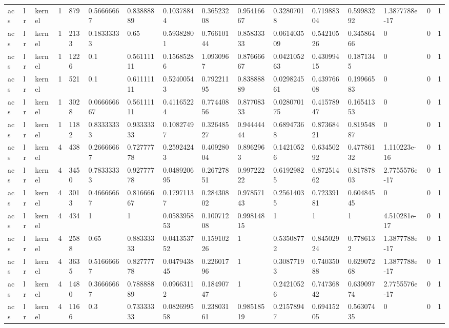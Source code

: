 \begin{tabular}{llllllllllllllll}
acs & lr & kernel & 1 & 879 & 0.56666667 & 0.83888889 & 0.10378844 & 0.36523208 & 0.95416667 & 0.32807018 & 0.71988304 & 0.59983292 & 1.3877788e-17 & 0 & 1 \\
acs & lr & kernel & 1 & 2133 & 0.18333333 & 0.65 & 0.59382801 & 0.76610144 & 0.85833333 & 0.061403509 & 0.54210526 & 0.34586466 & 0 & 0 & 1 \\
acs & lr & kernel & 1 & 1226 & 0.1 & 0.56111111 & 0.15685286 & 1.0930967 & 0.87666667 & 0.042105263 & 0.43099415 & 0.1871345 & 0 & 0 & 1 \\
acs & lr & kernel & 1 & 521 & 0.1 & 0.61111111 & 0.52400543 & 0.79221195 & 0.83888889 & 0.029824561 & 0.43976608 & 0.19966583 & 0 & 0 & 1 \\
acs & lr & kernel & 1 & 3028 & 0.066666667 & 0.56111111 & 0.41165224 & 0.77440856 & 0.87708333 & 0.028070175 & 0.41578947 & 0.16541353 & 0 & 0 & 1 \\
acs & lr & kernel & 1 & 1182 & 0.83333333 & 0.93333333 & 0.10827497 & 0.32648527 & 0.94444444 & 0.68947368 & 0.87368421 & 0.81954887 & 0 & 0 & 1 \\
acs & lr & kernel & 4 & 438 & 0.26666667 & 0.72777778 & 0.25924243 & 0.40928004 & 0.8962963 & 0.14210526 & 0.63450292 & 0.47786132 & 1.110223e-16 & 0 & 1 \\
acs & lr & kernel & 4 & 3450 & 0.78333333 & 0.92777778 & 0.048920695 & 0.26727851 & 0.99722222 & 0.61929825 & 0.87251462 & 0.81787803 & 2.7755576e-17 & 0 & 1 \\
acs & lr & kernel & 4 & 3013 & 0.46666667 & 0.81666667 & 0.17971137 & 0.28430802 & 0.97857143 & 0.25614035 & 0.72339181 & 0.60484545 & 0 & 0 & 1 \\
acs & lr & kernel & 4 & 434 & 1 & 1 & 0.058395853 & 0.10071208 & 0.99814815 & 1 & 1 & 1 & 4.510281e-17 & 0 & 1 \\
acs & lr & kernel & 4 & 2588 & 0.65 & 0.88333333 & 0.041353752 & 0.15910226 & 1 & 0.53508772 & 0.84502924 & 0.7786132 & 1.3877788e-17 & 0 & 1 \\
acs & lr & kernel & 4 & 3635 & 0.51666667 & 0.82777778 & 0.047943845 & 0.22601796 & 1 & 0.30877193 & 0.74035088 & 0.62907268 & 1.3877788e-17 & 0 & 1 \\
acs & lr & kernel & 4 & 1480 & 0.36666667 & 0.78888889 & 0.09663112 & 0.18490747 & 1 & 0.24210526 & 0.74736842 & 0.63909774 & 2.7755576e-17 & 0 & 1 \\
acs & lr & kernel & 4 & 1166 & 0.3 & 0.73333333 & 0.082699558 & 0.23803161 & 0.98518519 & 0.21578947 & 0.69415205 & 0.56307435 & 0 & 0 & 1 \\

\end{tabular}

